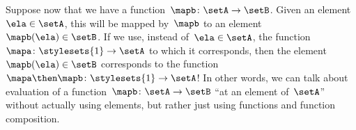Suppose now that we have a function~$\mapb \colon \setA \to \setB$.
Given an element~$\ela \in \setA$, this will be mapped by~$\mapb$ to an element~$\mapb(\ela) \in \setB$.
If we use, instead of~$\ela \in \setA$, the function~$\mapa \colon \stylesets{1} \to \setA$ to which it corresponds, then the element~$\mapb(\ela) \in \setB$ corresponds to the function~$\mapa \then \mapb\colon \stylesets{1} \to \setA$!
In other words, we can talk about evaluation of a function~$\mapb \colon \setA \to \setB$ ``at an element of~$\setA$'' without actually using elements, but rather just using functions and function composition.







\clearpage
